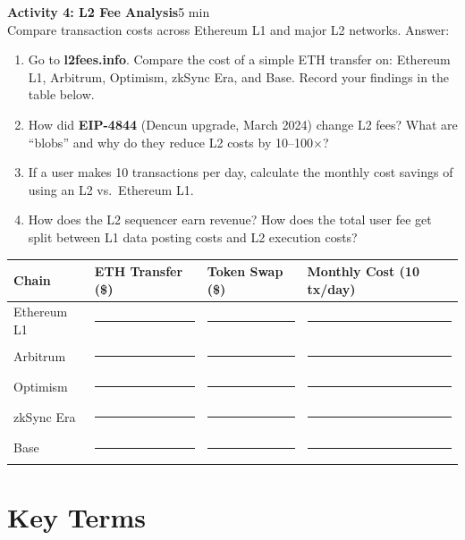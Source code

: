 \documentclass[11pt,a4paper]{article}
\newcommand{\activitybox}[3]{%
  \noindent\colorbox{mllavender4}{\parbox{\dimexpr\linewidth-2\fboxsep}{%
    \textbf{\color{mlpurple}#1}\hfill\textcolor{mlgray}{\small #2}\\[2pt]#3%
  }}\par\vspace{4pt}%
}
\newcommand{\fillcell}{\rule{2.2cm}{0.3pt}}
\begin{document}
\activitybox{Activity 4: L2 Fee Analysis}{5 min}{%
Compare transaction costs across Ethereum L1 and major L2 networks. Answer:
\begin{enumerate}
\item Go to \textbf{l2fees.info}. Compare the cost of a simple ETH transfer on: Ethereum L1, Arbitrum, Optimism, zkSync Era, and Base. Record your findings in the table below.
\item How did \textbf{EIP-4844} (Dencun upgrade, March 2024) change L2 fees? What are ``blobs'' and why do they reduce L2 costs by 10--100$\times$?
\item If a user makes 10 transactions per day, calculate the monthly cost savings of using an L2 vs.\ Ethereum L1.
\item How does the L2 sequencer earn revenue? How does the total user fee get split between L1 data posting costs and L2 execution costs?
\end{enumerate}
\vspace{4pt}
{\footnotesize\renewcommand{\arraystretch}{1.35}%
\setlength{\tabcolsep}{5pt}%
\begin{tabular}{@{}llll@{}}
\toprule
\textbf{Chain} & \textbf{ETH Transfer (\$)} & \textbf{Token Swap (\$)} & \textbf{Monthly Cost (10 tx/day)} \\
\midrule
Ethereum L1  & \fillcell & \fillcell & \fillcell \\
Arbitrum     & \fillcell & \fillcell & \fillcell \\
Optimism     & \fillcell & \fillcell & \fillcell \\
zkSync Era   & \fillcell & \fillcell & \fillcell \\
Base         & \fillcell & \fillcell & \fillcell \\
\bottomrule
\end{tabular}}
\vspace{2pt}
}

\vspace{4pt}

\section{Key Terms}
\end{document}
